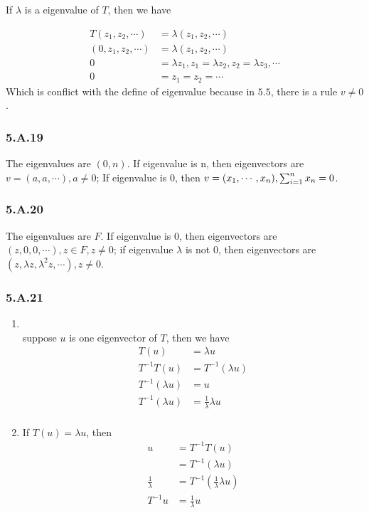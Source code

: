 If $\lambda$ is a eigenvalue of $T$, then we have

\begin{equation*}
    \begin{split}
    T(z_{1}, z_{2}, \cdots) &= \lambda (z_{1}, z_{2}, \cdots) \\
    (0, z_{1}, z_{2}, \cdots) &= \lambda (z_{1}, z_{2}, \cdots) \\
    0 &= \lambda z_{1}, z_{1} = \lambda z_{2}, z_{2} = \lambda z_{3}, \cdots \\
    0 &= z_{1} = z_{2} = \cdots
\end{split}
\end{equation*}
Which is conflict with the define of eigenvalue because in $5.5$, there is a rule  $v\neq 0$.

\subsubsection*{5.A.19}

The eigenvalues are $(0, n)$.
If eigenvalue is n, then eigenvectors are $v = (a, a, \cdots), a \neq 0$; If eigenvalue is 0, then $v = (x_{1},\cdots,x_{n}), \sum_{i=1}^{n}x_{n} = 0$.

\subsubsection*{5.A.20}

The eigenvalues are $F$.
If eigenvalue is 0, then eigenvectors are $(z, 0, 0, \cdots), z\in F, z \neq 0$; if eigenvalue $\lambda$ is not 0, then eigenvectors are $(z, \lambda z,\lambda^{2}z,\cdots), z\neq 0$.

\subsubsection*{5.A.21}
\begin{enumerate}[label=(\alph*)]
\item \\
suppose $u$ is one eigenvector of $T$, then we have
\begin{equation*}
    \begin{split}
    T(u) &= \lambda u \\
    T^{-1}T(u) &= T^{-1}(\lambda u) \\
    T^{-1}(\lambda u) &= u \\
    T^{-1}(\lambda u) &= \frac{1}{\lambda}\lambda u \\
\end{split}
\end{equation*}

\item 
If $T(u) = \lambda u$, then
\begin{equation*}
    \begin{split}
    u &= T^{-1}T(u) \\
    &= T^{-1}(\lambda u) \\
    \frac{1}{\lambda} &= T^{-1}(\frac{1}{\lambda}\lambda u) \\
    T^{-1}u &= \frac{1}{\lambda}u
\end{split}
\end{equation*}
\end{enumerate}


